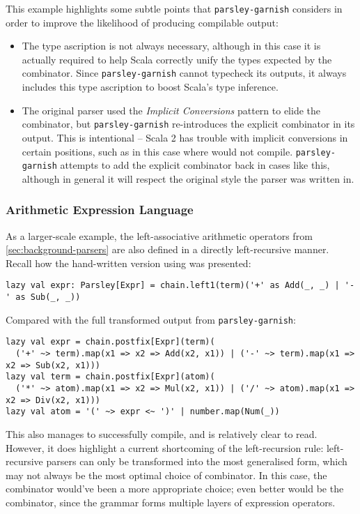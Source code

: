 \documentclass[../../main.tex]{subfiles}
\begin{document}
%
This example highlights some subtle points that \texttt{parsley-garnish} considers in order to improve the likelihood of producing compilable output:
\begin{itemize}
  \item The type ascription  is not always necessary, although in this case it is actually required to help Scala correctly unify the types expected by the combinator. Since \texttt{parsley-garnish} cannot typecheck its outputs, it always includes this type ascription to boost Scala's type inference.
  \item The original parser used the \emph{Implicit Conversions} pattern to elide the  combinator, but \texttt{parsley-garnish} re-introduces the explicit  combinator in its output. This is intentional -- Scala 2 has trouble with implicit conversions in certain positions, such as in this case where  would not compile. \texttt{parsley-garnish} attempts to add the explicit combinator back in cases like this, although in general it will respect the original style the parser was written in.
\end{itemize}

\subsubsection{Arithmetic Expression Language}
As a larger-scale example, the left-associative arithmetic operators from \cref{sec:background-parsers} are also defined in a directly left-recursive manner.
Recall how the hand-written version using  was presented:
\begin{verbatim}
lazy val expr: Parsley[Expr] = chain.left1(term)('+' as Add(_, _) | '-' as Sub(_, _))
\end{verbatim}
%
Compared with the full transformed output from \texttt{parsley-garnish}:
\begin{verbatim}
lazy val expr = chain.postfix[Expr](term)(
  ('+' ~> term).map(x1 => x2 => Add(x2, x1)) | ('-' ~> term).map(x1 => x2 => Sub(x2, x1)))
lazy val term = chain.postfix[Expr](atom)(
  ('*' ~> atom).map(x1 => x2 => Mul(x2, x1)) | ('/' ~> atom).map(x1 => x2 => Div(x2, x1)))
lazy val atom = '(' ~> expr <~ ')' | number.map(Num(_))
\end{verbatim}
%
This also manages to successfully compile, and is relatively clear to read.
However, it does highlight a current shortcoming of the left-recursion rule: left-recursive parsers can only be transformed into the most generalised  form, which may not always be the most optimal choice of combinator.
In this case, the  combinator would've been a more appropriate choice; even better would be the  combinator, since the grammar forms multiple layers of expression operators.
\end{document}
